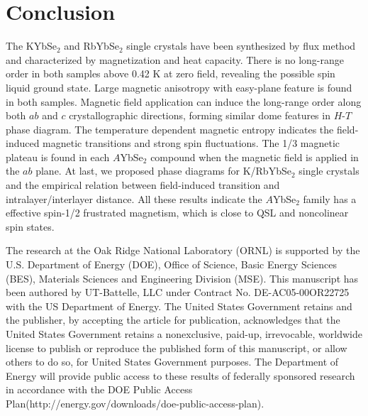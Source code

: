 \documentclass[%
 aip,
 amsmath,amssymb,
 reprint,%
]{revtex4-1}
\begin{document}
\section{\label{sec:level1}Conclusion}

The KYbSe$_2$ and RbYbSe$_2$ single crystals have been synthesized by flux method and characterized by magnetization and heat capacity. There is no long-range order in both samples above 0.42 K at zero field, revealing the possible spin liquid ground state. Large magnetic anisotropy with easy-plane feature is found in both samples. Magnetic field application can induce the long-range order along both $ab$ and $c$ crystallographic directions, forming similar dome features in $H$-$T$ phase diagram. The temperature dependent magnetic entropy indicates the field-induced magnetic transitions and strong spin fluctuations. The 1/3 magnetic plateau is found in each $A$YbSe$_2$ compound when the magnetic field is applied in the $ab$ plane. At last, we proposed phase diagrams for K/RbYbSe$_2$ single crystals and the empirical relation between field-induced transition and intralayer/interlayer distance. All these results indicate the $A$YbSe$_2$ family has a effective spin-1/2 frustrated magnetism, which is close to QSL and noncolinear spin states.


\begin{acknowledgments}
The research at the Oak Ridge National Laboratory (ORNL) is supported by the U.S. Department of Energy (DOE), Office of Science, Basic Energy Sciences (BES), Materials Sciences and Engineering Division (MSE).
This manuscript has been authored by UT-Battelle, LLC under Contract No. DE-AC05-00OR22725 with the US Department of Energy. The United States Government retains and the publisher, by accepting the article for publication, acknowledges that the United States Government retains a nonexclusive, paid-up, irrevocable, worldwide license to publish or reproduce the published form of this manuscript, or allow others to do so, for United States Government purposes. The Department of Energy will provide public access to these results of federally sponsored research in accordance with the DOE Public Access Plan(http://energy.gov/downloads/doe-public-access-plan).

\end{acknowledgments}


\end{document}

